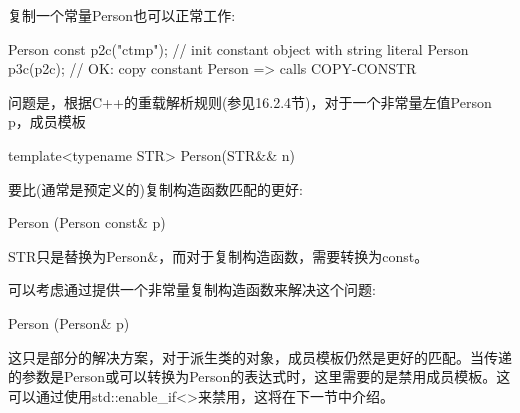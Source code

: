 复制一个常量Person也可以正常工作:

\begin{cpp}
Person const p2c("ctmp"); // init constant object with string literal
Person p3c(p2c); // OK: copy constant Person => calls COPY-CONSTR
\end{cpp}

问题是，根据C++的重载解析规则(参见16.2.4节)，对于一个非常量左值Person p，成员模板

\begin{cpp}
template<typename STR>
Person(STR&& n)
\end{cpp}

要比(通常是预定义的)复制构造函数匹配的更好:

\begin{cpp}
Person (Person const& p)
\end{cpp}

STR只是替换为Person\&，而对于复制构造函数，需要转换为const。

可以考虑通过提供一个非常量复制构造函数来解决这个问题:

\begin{cpp}
Person (Person& p)
\end{cpp}

这只是部分的解决方案，对于派生类的对象，成员模板仍然是更好的匹配。当传递的参数是Person或可以转换为Person的表达式时，这里需要的是禁用成员模板。这可以通过使用std::enable\_if<>来禁用，这将在下一节中介绍。
































